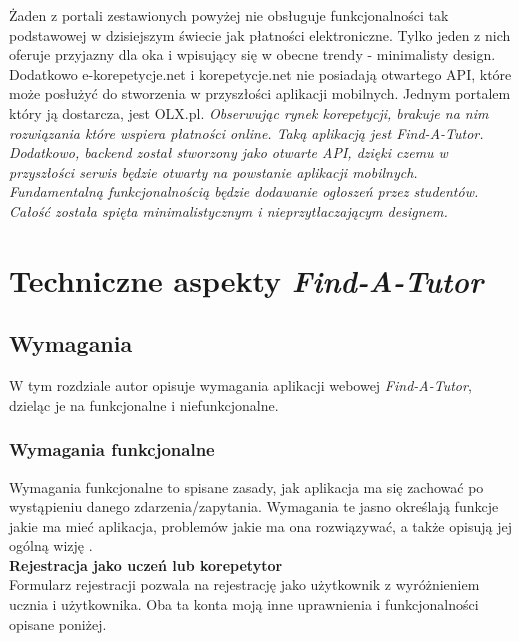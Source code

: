 \documentclass[12pt]{article}
\numberwithin{figure}{section}
\begin{document}
\begin{sloppypar}
Żaden z portali zestawionych powyżej nie obsługuje funkcjonalności tak podstawowej w dzisiejszym świecie jak płatności elektroniczne. Tylko jeden z nich oferuje przyjazny dla oka i wpisujący się w obecne trendy - minimalisty design. Dodatkowo e-korepetycje.net i korepetycje.net nie posiadają otwartego API, które może posłużyć do stworzenia w przyszłości aplikacji mobilnych. Jednym portalem który ją dostarcza, jest OLX.pl.
\newline
\newline
\textit{Obserwując rynek korepetycji, brakuje na nim rozwiązania które wspiera płatności online. Taką aplikacją jest Find-A-Tutor. Dodatkowo, backend został stworzony jako otwarte API, dzięki czemu w przyszłości serwis będzie otwarty na powstanie aplikacji mobilnych. Fundamentalną funkcjonalnością będzie dodawanie ogłoszeń przez studentów. Całość została spięta minimalistycznym i nieprzytłaczającym designem.}

\section{Techniczne aspekty \textit{Find-A-Tutor}}

\subsection{Wymagania}
W tym rozdziale autor opisuje wymagania aplikacji webowej \textit{Find-A-Tutor}, dzieląc je na funkcjonalne i niefunkcjonalne. 

\subsubsection{Wymagania funkcjonalne}
Wymagania funkcjonalne to spisane zasady, jak aplikacja ma się zachować po wystąpieniu danego zdarzenia/zapytania. Wymagania te jasno określają funkcje jakie ma mieć aplikacja, problemów jakie ma ona rozwiązywać, a także opisują jej ogólną wizję \cite{funkcjonalne}. \\
\noindent
\textbf{Rejestracja jako uczeń lub korepetytor}\\
\indent
Formularz rejestracji pozwala na rejestrację jako użytkownik z wyróżnieniem ucznia i użytkownika. Oba ta konta moją inne uprawnienia i funkcjonalności opisane poniżej.


\end{sloppypar}
\end{document}

